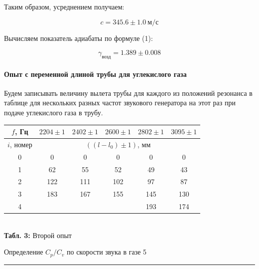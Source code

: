 \documentclass[12pt,a4paper]{scrartcl}
\begin{document}
	Таким образом, усреднением получаем:
	
	$$c = 345.6 \pm 1.0\ \text{м}/\text{с}$$
	
	Вычисляем показатель адиабаты по формуле (1):
	
	$$\gamma_{\text{возд}} = 1.389 \pm 0.008$$
	
	\paragraph{Опыт с переменной длиной трубы для углекислого газа} \hfill
	
	Будем записывать величину вылета трубы для каждого из положений резонанса в таблице для нескольких разных частот звукового генератора на этот раз при подаче углекислого газа в трубу.
	
	\begin{center}
		\begin{tabular}{|c|c|c|c|c|c|}
			\hline
			$f$, Гц & $2204 \pm 1$ &  $2402 \pm 1$ & $2600 \pm 1$ & $2802 \pm 1$ & $3095 \pm 1$
			\\\hline
			$i$, номер & \multicolumn{5}{|c|}{$((l - l_0) \pm 1)$, мм}
			\\\hline
			0 & 0 & 0 & 0 & 0 & 0
			\\\hline
			1 & 62 & 55 & 52 & 49 & 43
			\\\hline
			2 & 122 & 111 & 102 & 97 & 87
			\\\hline
			3 & 183 & 167 & 155 & 145 & 130
			\\\hline
			4 &     &     &     & 193 & 174
			\\\hline
		\end{tabular}
		\\\textbf{Табл. 3:} Второй опыт
	\end{center}

	\newpage

	
	\begin{flushleft}
		\footnotesize{Определение $C_p /C_v$ по скорости звука в газе} \hspace{\fill} \footnotesize{5}
		\\[-0.3cm]\noindent\rule{\textwidth}{0.3pt}
	\end{flushleft}
\end{document}
